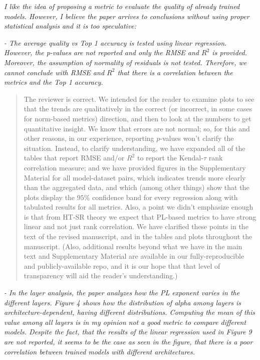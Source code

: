\documentclass[11pt]{article}
\begin{document}
\noindent
\emph{%
I like the idea of proposing a metric to evaluate the quality of already trained models. 
However, I believe the paper arrives to conclusions without using proper statistical analysis and it is too speculative:
}

\noindent
\emph{%
- The average quality vs Top 1 accuracy is tested using linear regression. However, the p-values are not reported and only the RMSE and $R^2$ is provided. Moreover, the assumption of normality of residuals is not tested. Therefore, we cannot conclude with RMSE and $R^2$ that there is a correlation between the metrics and the Top 1 accuracy.
}

\begin{quote}
The reviewer is correct.  
We intended for the reader to examine plots to see that the trends are qualitatively in the correct (or incorrect, in some cases for norm-based metrics) direction, and then to look at the numbers to get quantitative insight.
We know that errors are not normal; so, for this and other reasons, in our experience, reporting $p$-values won't clarify the situation.
Instead, to clarify understanding, we have expanded all of the tables that report RMSE and/or $R^2$ to report the Kendal-$\tau$ rank correlation measure; and we have provided figures in the Supplementary Material for all model-dataset pairs, which indicates trends more clearly than the aggregated data, and which (among other things) show that the plots display the $95\%$ confidence band for every regression along with tabulated results for all metrics.
Also, a point we didn't emphasize enough is that from HT-SR theory we expect that PL-based metrics to have strong linear and not just rank correlation.
We have clarified these points 
in the text 
of the revised manuscript, and in the tables and plots throughout the manuscript.
(Also, additional results beyond what we have in the main text and Supplementary Material are available in our fully-reproducible and publicly-available repo, and it is our hope that that level of transparency will aid the reader's understanding.)
\end{quote}

\noindent
\emph{%
- In the layer analysis, the paper analyzes how the PL exponent varies in the different layers. Figure 4 shows how the distribution of alpha among layers is architecture-dependent, having different distributions. Computing the mean of this value among all layers is in my opinion not a good metric to compare different models. Despite the fact, that the results of the linear regression used in Figure 9 are not reported, it seems to be the case as seen in the figure, that there is a poor correlation between trained models with different architectures.
}
\end{document}
